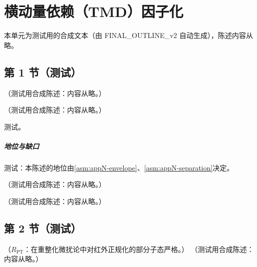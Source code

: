 \chapter{横动量依赖（TMD）因子化}\label{ch:tmd}
本单元为测试用的合成文本（由 FINAL\_OUTLINE\_v2 自动生成），陈述内容从略。

\section{第 1 节（测试）}\label{sec:tmd-kinematics}

\begin{definition}[小 $q_T$ 区域]\label{def:tmd-kin}
（测试用合成陈述：内容从略。）
\end{definition}

\begin{proposition}\label{prop:tmd-regions}
（测试用合成陈述：内容从略。）
\end{proposition}
\begin{proofsketch}测试。\end{proofsketch}
\paragraph{地位与缺口}测试：本陈述的地位由\cref{asm:appN-envelope}、\cref{asm:appN-separation}决定。

\begin{definition}\label{def:tmd-unsub}
（测试用合成陈述：内容从略。）
\end{definition}

\begin{definition}[软因子]\label{def:tmd-soft}
（测试用合成陈述：内容从略。）
\end{definition}

\section{第 2 节（测试）}\label{sec:tmd-regions}

\begin{lemma}\label{lem:tmd-soft-oneloop}
（$R_{\mathrm{PT}}$：在重整化微扰论中对红外正规化的部分子态严格。）
（测试用合成陈述：内容从略。）
\end{lemma}

